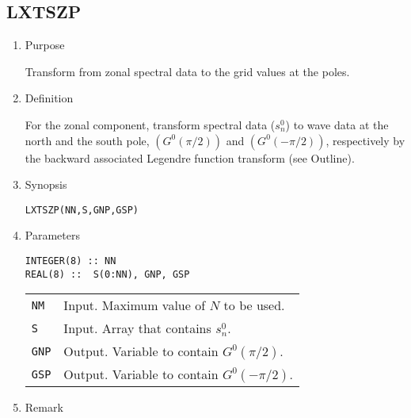 \documentclass[a4paper]{scrartcl}
\begin{document}

\subsection{LXTSZP}

\begin{enumerate}

\item Purpose

Transform from zonal spectral data to the grid
values at the poles.
  
\item Definition

For the zonal component, transform spectral data ($s^0_n$) 
to wave data at the north and the south pole, 
$(G^0(\pi/2))$ and $(G^0(-\pi/2))$, respectively
by the backward associated Legendre function transform (see Outline).

\item Synopsis 

\texttt{LXTSZP(NN,S,GNP,GSP)}
  
\item Parameters

\begin{verbatim}  
INTEGER(8) :: NN
REAL(8) ::  S(0:NN), GNP, GSP
\end{verbatim}  

\begin{tabular}{ll}
\texttt{NM} & Input. Maximum value of $N$ to be used.\\
\texttt{S} & Input. Array that contains $s^0_n$.\\
\texttt{GNP} & Output. Variable to contain $G^0(\pi/2)$.\\
\texttt{GSP} & Output. Variable to contain $G^0(-\pi/2)$.
\end{tabular}

\item Remark

\end{enumerate}
\end{document}
